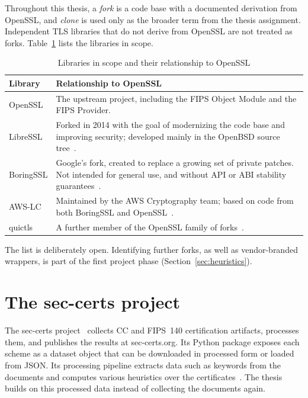 Throughout this thesis, a \emph{fork} is a code base with a documented
derivation from OpenSSL, and \emph{clone} is used only as the broader term from
the thesis assignment. Independent TLS libraries that do not derive from OpenSSL
are not treated as forks. Table~\ref{tab:libraries} lists the libraries in scope.

\begin{table}[htbp]
  \centering
  \caption{Libraries in scope and their relationship to OpenSSL}
  \label{tab:libraries}
  \begin{tabular}{lp{}}
    \toprule
    Library & Relationship to OpenSSL \\
    \midrule
    OpenSSL & The upstream project, including the FIPS Object Module and the
      FIPS Provider. \\
    LibreSSL & Forked in 2014 with the goal of modernizing the code base and
      improving security; developed mainly in the OpenBSD source
      tree~\cite{libressl}. \\
    BoringSSL & Google's fork, created to replace a growing set of private
      patches. Not intended for general use, and without API or ABI stability
      guarantees~\cite{langley2014boringssl,boringssl}. \\
    AWS-LC & Maintained by the AWS Cryptography team; based on code from both
      BoringSSL and OpenSSL~\cite{awslc}. \\
    quictls & A further member of the OpenSSL family of
      forks~\cite{stenberg2025forks}. \\
    \bottomrule
  \end{tabular}
\end{table}

The list is deliberately open. Identifying further forks, as well as
vendor-branded wrappers, is part of the first project phase
(Section~\ref{sec:heuristics}).

\section{The sec-certs project}
\label{sec:seccerts}

The sec-certs project~\cite{janovsky2024seccerts} collects CC and FIPS~140
certification artifacts, processes them, and publishes the results at
sec-certs.org. Its Python package exposes each scheme as a dataset object that
can be downloaded in processed form or loaded from JSON. Its processing
pipeline extracts data such as keywords from the documents and computes various
heuristics over the certificates~\cite{seccertsDocs}. The thesis builds on this
processed data instead of collecting the documents again.

